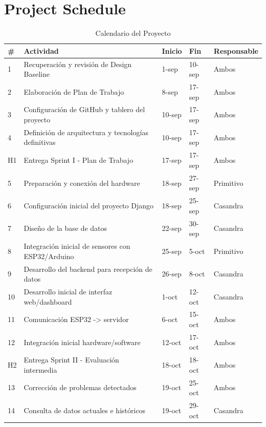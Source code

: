\section{Project Schedule}
 
\begin{table}[H]
    \centering
    \caption{Calendario del Proyecto}
    \begin{tabular}{|l|l|l|l|l|}
    \hline
        \# & Actividad & Inicio & Fin & Responsable  \\ \hline
        1 & Recuperación y revisión de Design Baseline & 1-sep & 10-sep & Ambos  \\ \hline
        2 & Elaboración de Plan de Trabajo & 8-sep & 17-sep & Ambos  \\ \hline
        3 & Configuración de GitHub y tablero del proyecto & 10-sep & 17-sep & Ambos  \\ \hline
        4 & Definición de arquitectura y tecnologías definitivas & 10-sep & 17-sep & Ambos  \\ \hline
        H1 & Entrega Sprint I - Plan de Trabajo & 17-sep & 17-sep & Ambos  \\ \hline
        5 & Preparación y conexión del hardware & 18-sep & 27-sep & Primitivo  \\ \hline
        6 & Configuración inicial del proyecto Django & 18-sep & 25-sep & Casandra  \\ \hline
        7 & Diseño de la base de datos & 22-sep & 30-sep & Casandra  \\ \hline
        8 & Integración inicial de sensores con ESP32/Arduino & 25-sep & 5-oct & Primitivo  \\ \hline
        9 & Desarrollo del backend para recepción de datos & 26-sep & 8-oct & Casandra  \\ \hline
        10 & Desarrollo inicial de interfaz web/dashboard & 1-oct & 12-oct & Casandra  \\ \hline
        11 & Comunicación ESP32 -> servidor & 6-oct & 15-oct & Ambos  \\ \hline
        12 & Integración inicial hardware/software & 12-oct & 17-oct & Ambos  \\ \hline
        H2 & Entrega Sprint II - Evaluación intermedia & 18-oct & 18-oct & Ambos  \\ \hline
        13 & Corrección de problemas detectados & 19-oct & 25-oct & Ambos  \\ \hline
        14 & Consulta de datos actuales e históricos & 19-oct & 29-oct & Casandra  \\ \hline

\end{tabular}
\end{table}
